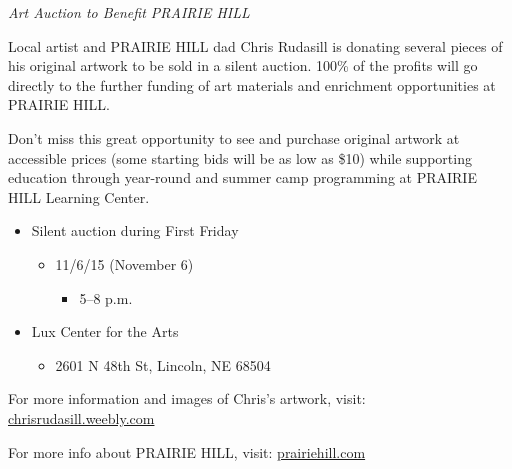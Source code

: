 \documentclass[11pt]{article}
\begin{document}
\begin{itemize}
\begin{itemize}
\begin{itemize}
\emph{Art Auction to Benefit PRAIRIE HILL}

Local artist and PRAIRIE HILL dad Chris Rudasill is donating 
several pieces of his original artwork to be sold in a silent 
auction. 100\% of the profits will go directly to the further 
funding of art materials and enrichment opportunities at PRAIRIE  
HILL. 

Don’t miss this great opportunity to see and purchase original artwork 
at accessible prices (some starting bids will be as low as \$10) while 
supporting education through year-round and summer camp programming at 
PRAIRIE HILL Learning Center.

\begin{itemize}
\item Silent auction during First Friday 
\begin{itemize}
\item 11/6/15 (November 6)
\begin{itemize}
\item 5–8 p.m.
\end{itemize}
\end{itemize}
\item Lux Center for the Arts 
\begin{itemize}
\item 2601 N 48th St, Lincoln, NE 68504
\end{itemize}
\end{itemize}
For more information and images of Chris’s artwork, visit: 
\href{http://chrisrudasill.weebly.com}{chrisrudasill.weebly.com}   

For more info about PRAIRIE HILL, visit:   
\href{http://prairiehill.com}{prairiehill.com}


\end{itemize}
\end{itemize}
\end{itemize}
\end{document}
